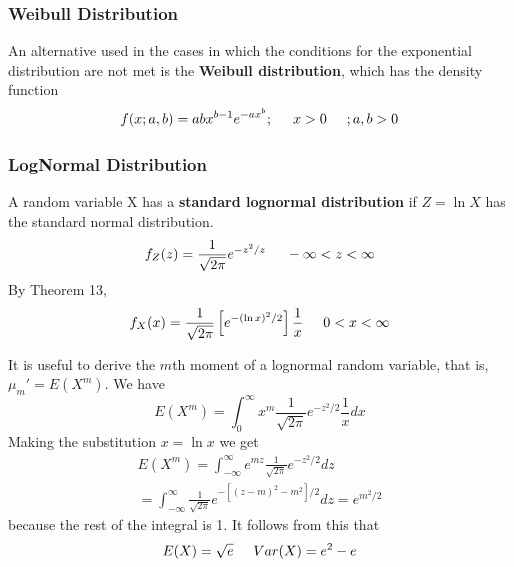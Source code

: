\documentclass{article}
\begin{document}
\subsubsection{Weibull Distribution}

An alternative used in the cases in which the conditions for the exponential distribution are not met is the \textbf{Weibull distribution}, which has the density function
\begin{equation*}
    f(x;a,b) = abx^{b-1}e^{-ax^b}; \hspace{0.5cm} x>0 \hspace{0.5cm}; a,b>0
\end{equation*}

\subsubsection{LogNormal Distribution}

A random variable X has a \textbf{standard lognormal distribution} if \(Z=\ln X\) has the standard normal distribution.
\begin{equation*}
    f_Z(z)=\frac{1}{\sqrt{2\pi}}e^{-z^2/z} \hspace{0.5cm} -\infty < z < \infty
\end{equation*}
By Theorem 13, 
\begin{equation*}
    f_X(x)=\frac{1}{\sqrt{2\pi}}\left[e^{-(\ln x)^2/2} \right] \frac{1}{x} \hspace{0.5 cm} 0 < x < \infty
\end{equation*}

It is useful to derive the \(m\)th moment of a lognormal random variable, that is, \(\mu_m'=E(X^m)\). We have
\begin{equation*}
    E(X^m)=\int_{0}^{\infty} x^m \frac{1}{\sqrt{2\pi}}e^{-z^2/2} \frac{1}{x} dx
\end{equation*}
Making the substitution \(x=\ln x\) we get
\begin{equation*}
\begin{split}
      E(X^m)=\int_{-\infty}^{\infty} e^{mz} \frac{1}{\sqrt{2\pi}}e^{-z^2/2} dz \\
      = \int_{-\infty}^{\infty} \frac{1}{\sqrt{2\pi}}e^{-[(z-m)^2-m^2]/2} dz = e^{m^2/2}
\end{split}
\end{equation*}
because the rest of the integral is 1. It follows from this that
\begin{equation*}
    E(X)=\sqrt{e} \hspace{0.5cm} Var(X)=e^2-e
\end{equation*}
\end{document}
